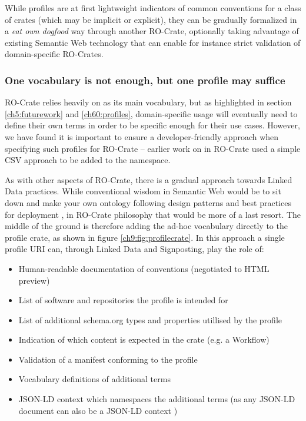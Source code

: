 While profiles are at first lightweight indicators of common conventions for a class of crates (which may be implicit or explicit), they can be gradually formalized in a \emph{eat own dogfood} way through another RO-Crate, optionally taking advantage of existing Semantic Web technology that can enable for instance strict validation of domain-specific RO-Crates.


\subsubsection{One vocabulary is not enough, but one profile may suffice}

RO-Crate relies heavily on \cite{schema.org} as its main vocabulary, but as highlighted in section \vref{ch5:futurework} and \vref{ch60:profiles}, domain-specific usage will eventually need to define their own terms in order to be specific enough for their use cases. However, we have found it is important to ensure a developer-friendly approach when specifying such profiles for RO-Crate -- earlier work on  in RO-Crate used a simple CSV approach to be added to the  namespace.  

As with other aspects of RO-Crate, there is a gradual approach towards Linked Data practices. While conventional wisdom in Semantic Web would be to sit down and make your own ontology following design patterns \cite{Blomquist 2009,Poveda 2010} and best practices for deployment \cite{Matentzoglu 2022}, in RO-Crate philosophy that would be more of a last resort. The middle of the ground is therefore adding the ad-hoc vocabulary directly to the profile crate, as shown in figure \vref{ch9:fig:profilecrate}. In this approach a single profile URI can, through Linked Data and Signposting, play the role of:

\begin{itemize}
  \item Human-readable documentation of conventions (negotiated to HTML preview)
  \item List of software and repositories the profile is intended for
  \item List of additional schema.org types and properties utillised by the profile
  \item Indication of which content is expected in the crate (e.g. a Workflow)
  \item Validation of a manifest conforming to the profile
  \item Vocabulary definitions of additional terms
  \item JSON-LD context which namespaces the additional terms  (as any JSON-LD document can also be a JSON-LD context \cite{w3-json-ld})
\end{itemize}


